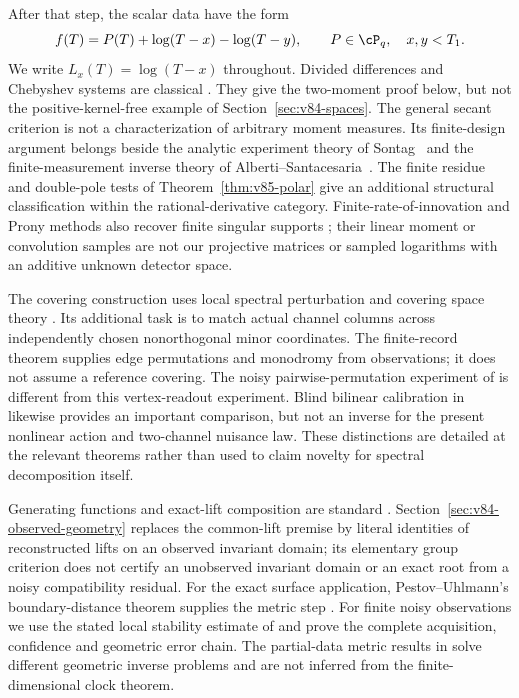 After that step, the scalar data have the form
\begin{equation}\label{eq:v83-scalar}
 f(T)=P(T)+\log(T-x)-\log(T-y),\qquad P\in\cP_q,
 \quad x,y<T_1.
\end{equation}
We write $L_x(T)=\log(T-x)$ throughout.
Divided differences and Chebyshev systems are classical
\cite{V83deBoor,V83KS}. They give the two-moment proof below, but not
the positive-kernel-free example of Section~\ref{sec:v84-spaces}.
The general secant criterion is not a characterization of arbitrary
moment measures. Its finite-design argument belongs beside the
analytic experiment theory of Sontag~\cite{V85Sontag} and the
finite-measurement inverse theory of Alberti--Santacesaria~\cite{V85AS}.
The finite residue and double-pole tests of
Theorem~\ref{thm:v85-polar} give an additional structural classification
within the rational-derivative category.
Finite-rate-of-innovation and Prony methods also recover finite
singular supports \cite{V84VMB,V84BY}; their linear moment or
convolution samples are not our projective matrices or sampled
logarithms with an additive unknown detector space.

The covering construction uses local spectral perturbation and covering
space theory \cite{V84Kato,V84Hatcher}. Its additional task is to match
actual channel columns across independently chosen nonorthogonal minor
coordinates. The finite-record theorem supplies edge permutations and
monodromy from observations; it does not assume a reference covering.
The noisy pairwise-permutation experiment of \cite{V85NZ} is different
from this vertex-readout experiment. Blind bilinear calibration in
\cite{V85LS} likewise provides an important comparison, but not an
inverse for the present nonlinear action and two-channel nuisance law.
These distinctions are detailed at the relevant theorems rather than
used to claim novelty for spectral decomposition itself.

Generating functions and exact-lift composition are standard
\cite{V83MW,V83Geiges}. Section~\ref{sec:v84-observed-geometry} replaces
the common-lift premise by literal identities of reconstructed lifts on
an observed invariant domain; its elementary group criterion does not
certify an unobserved invariant domain or an exact root from a noisy
compatibility residual. For the exact surface application,
Pestov--Uhlmann's boundary-distance theorem supplies the metric step
\cite{V84PU}. For finite noisy observations we use the stated local
stability estimate of \cite{V85SU} and prove the complete acquisition,
confidence and geometric error chain. The partial-data metric results
in \cite{V84SUV} solve different geometric inverse problems and are
not inferred from the finite-dimensional clock theorem.

